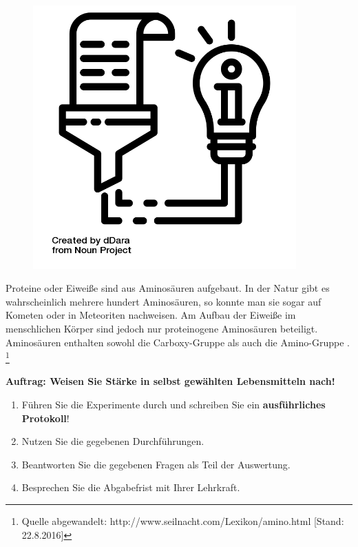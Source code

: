 \documentclass{scrartcl}  %
\begin{document}
\vspace{0.3cm}
			\begin{tcolorbox}[enhanced,
				colback=white,
				colframe=darkgray,
				fonttitle=\sffamily\bfseries\large, 
				title=Proteine,  %
				attach boxed title to top left={xshift=3.2mm,yshift=-0.50mm},
				boxed title style={skin=enhancedfirst jigsaw,size=small,arc=1mm,bottom=-1mm,colframe=darkgray,height=0.75cm},
				colbacktitle=darkgray,
				drop lifted shadow]
				\begin{figure}  
					\centering
					\vspace{-14pt}  %
					\includegraphics[width=0.9\textwidth]{symbols/symbol_tex_content}
				\end{figure}
				
				Proteine oder Eiweiße sind aus Aminosäuren aufgebaut. In der Natur gibt es wahrscheinlich mehrere hundert Aminosäuren, so konnte man sie sogar auf Kometen oder in Meteoriten nachweisen. Am Aufbau der Eiweiße im menschlichen Körper sind jedoch nur proteinogene Aminosäuren beteiligt. Aminosäuren enthalten sowohl die Carboxy-Gruppe  als auch die Amino-Gruppe .
				\footnote{Quelle abgewandelt: http://www.seilnacht.com/Lexikon/amino.html [Stand: 22.8.2016]}
			\end{tcolorbox}

\vspace{0.3cm}
			\noindent \textbf{Auftrag: Weisen Sie Stärke in selbst gewählten Lebensmitteln nach!}
			\begin{enumerate}
				\item Führen Sie die Experimente durch und schreiben Sie ein \textbf{ausführliches Protokoll}!
			    \item Nutzen Sie die gegebenen Durchführungen.
			    \item Beantworten Sie die gegebenen Fragen als Teil der Auswertung.
			    \item Besprechen Sie die Abgabefrist mit Ihrer Lehrkraft.
			\end{enumerate}	
			
\end{document}
